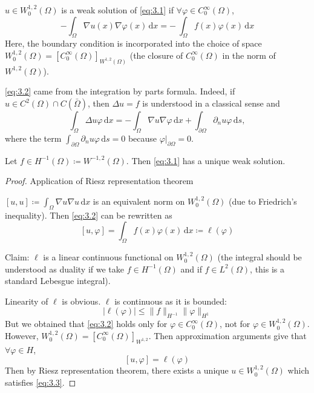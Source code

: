 \documentclass{report}
\begin{document}
\begin{definition}{}{}
    \(u \in W^{1, 2}_{0}(\Omega)\) is a weak solution of \ref{eq:3.1} if \(\forall \varphi \in C^{\infty}_{0}(\Omega)\),
    \begin{equation}\label{eq:3.2}
        - \int_{\Omega} \nabla u(x) \nabla \varphi(x) \,\mathrm{d}x = - \ \int_{\Omega} f(x) \varphi(x) \,\mathrm{d}x
    \end{equation}
    Here, the boundary condition is incorporated into the choice of space \(W^{1, 2}_{0}(\Omega) = [C^{\infty}_{0}(\Omega)]_{W^{1, 2}(\Omega)}\) (the closure of \(C^{\infty}_{0}(\Omega)\) in the norm of \(W^{1, 2}(\Omega)\)). 

    \ref{eq:3.2} came from the integration by parts formula. Indeed, if \(u \in C^{2}(\Omega) \cap C(\bar{\Omega})\), then \(\Delta u = f\) is understood in a classical sense and
    \[
        \int_{\Omega} \Delta u \varphi \,\mathrm{d}x = - \int_{\Omega} \nabla u \nabla \varphi \,\mathrm{d}x + \int_{\partial\Omega} \partial_{n} u \varphi \,\mathrm{d}s,
    \]
    where the term \(\int_{\partial\Omega} \partial_{n} u \varphi \,\mathrm{d}s = 0\) because \(\left. \varphi \right|_{\partial \Omega} = 0\).
\end{definition}

\begin{theorem}{}{}
    Let \(f \in H^{-1}(\Omega) \coloneqq W^{-1, 2}(\Omega)\). Then \ref{eq:3.1} has a unique weak solution.
\end{theorem}

\begin{proof}{Application of Riesz representation theorem}

    \([u,u] \coloneqq \int_{\Omega} \nabla u \nabla u \,\mathrm{d}x\) is an equivalent norm on \(W^{1, 2}_{0}(\Omega)\) (due to Friedrich's inequality). Then \ref{eq:3.2} can be rewritten as
    \[
        [u, \varphi] = \int_{\Omega} f(x)\varphi(x) \,\mathrm{d}x \coloneqq \ell(\varphi)
    \]

    Claim: \(\ell\) is a linear continuous functional on \(W^{1, 2}_{0}(\Omega)\) (the integral should be understood as duality if we take \(f \in H^{-1}(\Omega)\) and if \(f \in L^{2}(\Omega)\), this is a standard Lebesgue integral).

    Linearity of \(\ell\) is obvious. \(\ell\) is continuous as it is bounded:
    \[
        \vert \ell(\varphi) \vert \leq \|f\|_{H^{-1}} \| \varphi \|_{H^{1}}
    \]
    But we obtained that \ref{eq:3.2} holds only for \(\varphi \in C^{\infty}_{0}(\Omega)\), not for \(\varphi \in W^{1, 2}_{0}(\Omega)\). However, \(W^{1, 2}_{0}(\Omega) = [C^{\infty}_{0}(\Omega)]_{W^{1, 2}}\). Then approximation arguments give that \(\forall \varphi \in H\), 
    \begin{equation}\label{eq:3.3}
        [u, \varphi] = \ell(\varphi)
    \end{equation}
    Then by Riesz representation theorem, there exists a unique \(u \in W^{1, 2}_{0}(\Omega)\) which satisfies \ref{eq:3.3}.
\end{proof}
\end{document}
